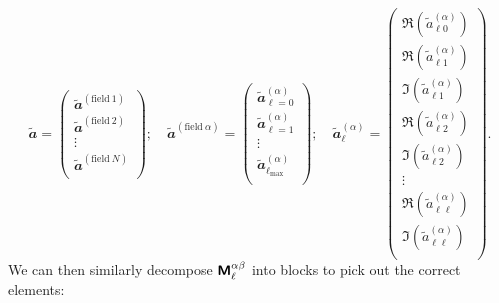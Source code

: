 \begin{equation}
    \widetilde{\mathbfit{a}} =
    \begin{pmatrix}
        \widetilde{\mathbfit{a}}^{\left( \mathrm{field~1} \right)} \\
        \widetilde{\mathbfit{a}}^{\left( \mathrm{field~2} \right)} \\
        \vdots \\
        \widetilde{\mathbfit{a}}^{\left( \mathrm{field~}N \right)} \\
    \end{pmatrix};
    \quad
    \widetilde{\mathbfit{a}}^{\left( \mathrm{field~}\alpha \right)} =
    \begin{pmatrix}
        \widetilde{\mathbfit{a}}_{\ell = 0}^{\left( \alpha \right)} \\
        \widetilde{\mathbfit{a}}_{\ell = 1}^{\left( \alpha \right)} \\
        \vdots \\
        \widetilde{\mathbfit{a}}_{\ell_\mathrm{max}}^{\left( \alpha \right)} \\
    \end{pmatrix};
    \quad
    \widetilde{\mathbfit{a}}_\ell^{\left( \alpha \right)} =
    \begin{pmatrix}
        \Re \left( \widetilde{a}_{\ell 0}^{\left( \alpha \right)} \right) \\
        \Re \left( \widetilde{a}_{\ell 1}^{\left( \alpha \right)} \right) \\
        \Im \left( \widetilde{a}_{\ell 1}^{\left( \alpha \right)} \right) \\
        \Re \left( \widetilde{a}_{\ell 2}^{\left( \alpha \right)} \right) \\
        \Im \left( \widetilde{a}_{\ell 2}^{\left( \alpha \right)} \right) \\
        \vdots \\
        \Re \left( \widetilde{a}_{\ell \ell}^{\left( \alpha \right)} \right) \\
        \Im \left( \widetilde{a}_{\ell \ell}^{\left( \alpha \right)} \right) \\
    \end{pmatrix}.
    \label{el_Eqn:a_hierarchy}
\end{equation}
We can then similarly decompose $\bm{\mathsf{M}}_\ell^{\alpha \beta}$ into blocks to pick out the correct elements:
